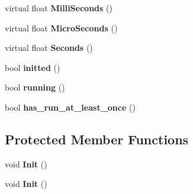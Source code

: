 \begin{DoxyCompactItemize}
virtual float {\bfseries Milli\+Seconds} ()
\item 
\mbox{\label{classcaffe_1_1_timer_aa32b2126898522ee6a2ad6e957619306}} 
virtual float {\bfseries Micro\+Seconds} ()
\item 
\mbox{\label{classcaffe_1_1_timer_aa9f9632139e54fbd2a802b37d607f9f3}} 
virtual float {\bfseries Seconds} ()
\item 
\mbox{\label{classcaffe_1_1_timer_a8f44fdd43378c9ef58471c6aae17c814}} 
bool {\bfseries initted} ()
\item 
\mbox{\label{classcaffe_1_1_timer_ae1a416ef3dfd11aefc73da5760bc98d7}} 
bool {\bfseries running} ()
\item 
\mbox{\label{classcaffe_1_1_timer_ae06252439c4e1731a4c36b5a9810787c}} 
bool {\bfseries has\+\_\+run\+\_\+at\+\_\+least\+\_\+once} ()
\end{DoxyCompactItemize}
\subsection*{Protected Member Functions}
\begin{DoxyCompactItemize}
\item 
\mbox{\label{classcaffe_1_1_timer_a9e5e1052cb6ea672940a300dc630c6c9}} 
void {\bfseries Init} ()
\item 
\mbox{\label{classcaffe_1_1_timer_a9e5e1052cb6ea672940a300dc630c6c9}} 
void {\bfseries Init} ()
\end{DoxyCompactItemize}
